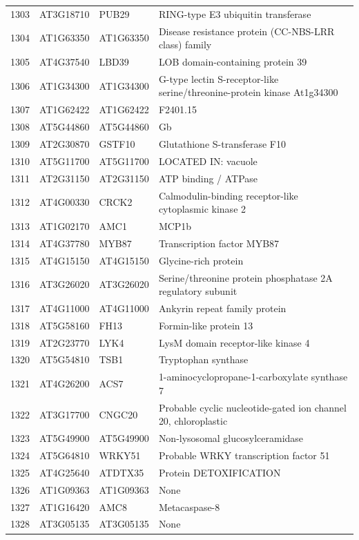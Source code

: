 \documentclass[11pt]{article}
\begin{document}
\begin{center}
\begin{tabular}{rlll}
1303 & AT3G18710 & PUB29 & RING-type E3 ubiquitin transferase\\
1304 & AT1G63350 & AT1G63350 & Disease resistance protein (CC-NBS-LRR class) family\\
1305 & AT4G37540 & LBD39 & LOB domain-containing protein 39\\
1306 & AT1G34300 & AT1G34300 & G-type lectin S-receptor-like serine/threonine-protein kinase At1g34300\\
1307 & AT1G62422 & AT1G62422 & F2401.15\\
1308 & AT5G44860 & AT5G44860 & Gb\\
1309 & AT2G30870 & GSTF10 & Glutathione S-transferase F10\\
1310 & AT5G11700 & AT5G11700 & LOCATED IN: vacuole\\
1311 & AT2G31150 & AT2G31150 & ATP binding / ATPase\\
1312 & AT4G00330 & CRCK2 & Calmodulin-binding receptor-like cytoplasmic kinase 2\\
1313 & AT1G02170 & AMC1 & MCP1b\\
1314 & AT4G37780 & MYB87 & Transcription factor MYB87\\
1315 & AT4G15150 & AT4G15150 & Glycine-rich protein\\
1316 & AT3G26020 & AT3G26020 & Serine/threonine protein phosphatase 2A regulatory subunit\\
1317 & AT4G11000 & AT4G11000 & Ankyrin repeat family protein\\
1318 & AT5G58160 & FH13 & Formin-like protein 13\\
1319 & AT2G23770 & LYK4 & LysM domain receptor-like kinase 4\\
1320 & AT5G54810 & TSB1 & Tryptophan synthase\\
1321 & AT4G26200 & ACS7 & 1-aminocyclopropane-1-carboxylate synthase 7\\
1322 & AT3G17700 & CNGC20 & Probable cyclic nucleotide-gated ion channel 20, chloroplastic\\
1323 & AT5G49900 & AT5G49900 & Non-lysosomal glucosylceramidase\\
1324 & AT5G64810 & WRKY51 & Probable WRKY transcription factor 51\\
1325 & AT4G25640 & ATDTX35 & Protein DETOXIFICATION\\
1326 & AT1G09363 & AT1G09363 & None\\
1327 & AT1G16420 & AMC8 & Metacaspase-8\\
1328 & AT3G05135 & AT3G05135 & None\\

\end{tabular}
\end{center}
\end{document}
